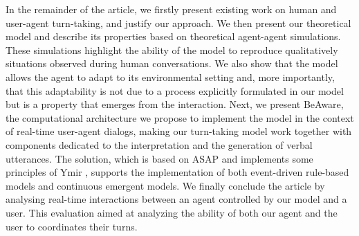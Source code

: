 
In the remainder of the article, we firstly present existing work on human and user-agent turn-taking, and justify our approach. 
We then present our theoretical model and describe its properties based on theoretical agent-agent simulations. These simulations highlight the ability of the model to reproduce qualitatively situations observed during human conversations. 
We also show that the model allows the agent to adapt to its environmental setting and, more importantly, that this adaptability is not due to a process explicitly formulated in our model but is a property that emerges from the interaction. 
Next, we present BeAware, the computational architecture we propose to implement the model in the context of real-time user-agent dialogs, making our turn-taking model work together with components dedicated to the interpretation and the generation of verbal utterances. The solution, which is based on ASAP \cite{kopp_architecture_2014} and implements some principles of Ymir \cite{thorisson_mind_1999}, supports the implementation of both event-driven rule-based models and continuous emergent models. 
We finally conclude the article by analysing real-time interactions between an agent controlled by our model and a user. 
 This evaluation aimed at analyzing the ability of both our agent and the user to coordinates their turns. 
